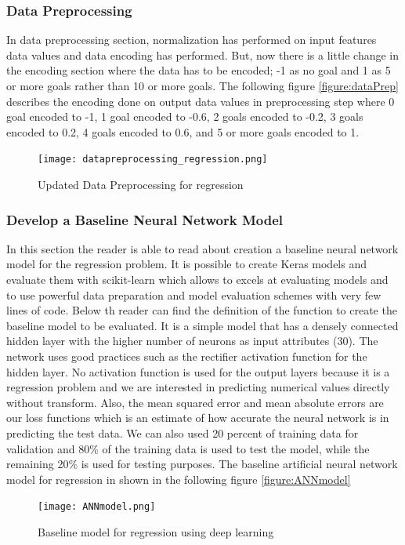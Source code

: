 \subsubsection{Data Preprocessing}
In data preprocessing section, normalization has performed on input features data values and data encoding has performed. But, now there is a little change in the encoding section where the data has to be encoded; -1 as no goal and 1 as 5 or more goals rather than 10 or more goals.\newline
The following figure \autoref{figure:dataPrep} describes the encoding done on output data values in preprocessing step where 0 goal encoded to -1, 1 goal encoded to -0.6, 2 goals encoded to -0.2, 3 goals encoded to 0.2, 4 goals encoded to 0.6, and 5 or more goals encoded to 1.\newline
\begin{figure}[H]
\begin{center}
\texttt{[image: datapreprocessing\_regression.png]}
\end{center}
\caption{Updated Data Preprocessing for regression }
\label{figure:dataPrep1}
\end{figure}
\subsubsection{Develop a Baseline Neural Network Model}
In this section the reader is able to read about creation a baseline neural network model for the regression problem. It is possible to create Keras models and evaluate them with scikit-learn which allows to excels at evaluating models and to use powerful data preparation and model evaluation schemes with very few lines of code.\newline
Below th reader can find the definition of the function to create the baseline model to be evaluated. It is a simple model that has a densely connected hidden layer with the higher number of neurons as input attributes (30). The network uses good practices such as the rectifier activation function for the hidden layer. No activation function is used for the output layers because it is a regression problem and we are interested in predicting numerical values directly without transform.\newline
Also, the mean squared error and mean absolute errors are our loss functions which is an estimate of how accurate the neural network is in predicting the test data. We can also used 20 percent of training data for validation and 80\% of the training data is used to test the model, while the remaining 20\% is used for testing purposes.\newline
The baseline artificial neural network model for regression in shown in the following figure \autoref{figure:ANNmodel} \newline
\begin{figure}[H]
\begin{center}
\texttt{[image: ANNmodel.png]}
\end{center}
\caption{Baseline model for regression using deep learning }
\label{figure:ANNmodel}
\end{figure}

